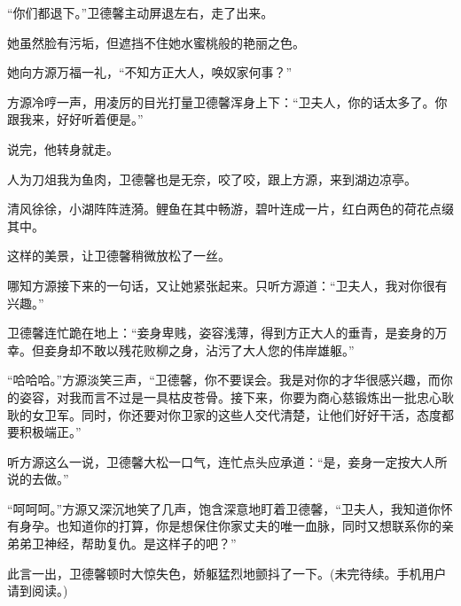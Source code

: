 \begin{this_body}
“你们都退下。”卫德馨主动屏退左右，走了出来。

她虽然脸有污垢，但遮挡不住她水蜜桃般的艳丽之色。

她向方源万福一礼，“不知方正大人，唤奴家何事？”

方源冷哼一声，用凌厉的目光打量卫德馨浑身上下：“卫夫人，你的话太多了。你跟我来，好好听着便是。”

说完，他转身就走。

人为刀俎我为鱼肉，卫德馨也是无奈，咬了咬，跟上方源，来到湖边凉亭。

清风徐徐，小湖阵阵涟漪。鲤鱼在其中畅游，碧叶连成一片，红白两色的荷花点缀其中。

这样的美景，让卫德馨稍微放松了一丝。

哪知方源接下来的一句话，又让她紧张起来。只听方源道：“卫夫人，我对你很有兴趣。”

卫德馨连忙跪在地上：“妾身卑贱，姿容浅薄，得到方正大人的垂青，是妾身的万幸。但妾身却不敢以残花败柳之身，沾污了大人您的伟岸雄躯。”

“哈哈哈。”方源淡笑三声，“卫德馨，你不要误会。我是对你的才华很感兴趣，而你的姿容，对我而言不过是一具枯皮苍骨。接下来，你要为商心慈锻炼出一批忠心耿耿的女卫军。同时，你还要对你卫家的这些人交代清楚，让他们好好干活，态度都要积极端正。”

听方源这么一说，卫德馨大松一口气，连忙点头应承道：“是，妾身一定按大人所说的去做。”

“呵呵呵。”方源又深沉地笑了几声，饱含深意地盯着卫德馨，“卫夫人，我知道你怀有身孕。也知道你的打算，你是想保住你家丈夫的唯一血脉，同时又想联系你的亲弟弟卫神经，帮助复仇。是这样子的吧？”

此言一出，卫德馨顿时大惊失色，娇躯猛烈地颤抖了一下。(未完待续。手机用户请到阅读。)

\end{this_body}

